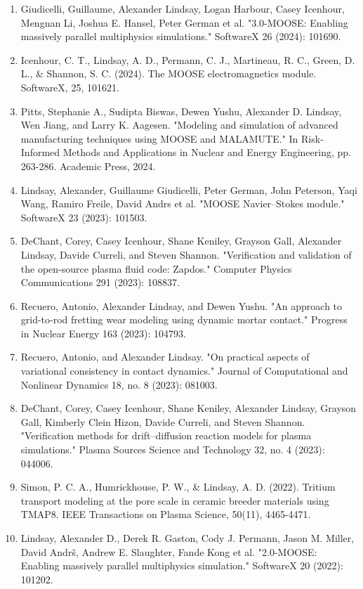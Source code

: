 \begin{enumerate}
    LWR fuel rod. Nuclear Engineering and Design, 424, 113291.
  \item Giudicelli, Guillaume, Alexander Lindsay, Logan Harbour, Casey Icenhour,
    Mengnan Li, Joshua E. Hansel, Peter German et al. "3.0-MOOSE: Enabling
    massively parallel multiphysics simulations." SoftwareX 26 (2024): 101690.
  \item Icenhour, C. T., Lindsay, A. D., Permann, C. J., Martineau, R. C.,
    Green, D. L., \& Shannon, S. C. (2024). The MOOSE electromagnetics
    module. SoftwareX, 25, 101621.
  \item Pitts, Stephanie A., Sudipta Biswas, Dewen Yushu, Alexander D. Lindsay, Wen Jiang, and Larry K. Aagesen. "Modeling and simulation of advanced manufacturing techniques using MOOSE and MALAMUTE." In Risk-Informed Methods and Applications in Nuclear and Energy Engineering, pp. 263-286. Academic Press, 2024.
  \item Lindsay, Alexander, Guillaume Giudicelli, Peter German, John Peterson, Yaqi Wang, Ramiro Freile, David Andrs et al. "MOOSE Navier–Stokes module." SoftwareX 23 (2023): 101503.
  \item DeChant, Corey, Casey Icenhour, Shane Keniley, Grayson Gall, Alexander Lindsay, Davide Curreli, and Steven Shannon. "Verification and validation of the open-source plasma fluid code: Zapdos." Computer Physics Communications 291 (2023): 108837.
  \item Recuero, Antonio, Alexander Lindsay, and Dewen Yushu. "An approach to grid-to-rod fretting wear modeling using dynamic mortar contact." Progress in Nuclear Energy 163 (2023): 104793.
  \item Recuero, Antonio, and Alexander Lindsay. "On practical aspects of variational consistency in contact dynamics." Journal of Computational and Nonlinear Dynamics 18, no. 8 (2023): 081003.
  \item DeChant, Corey, Casey Icenhour, Shane Keniley, Alexander Lindsay, Grayson Gall, Kimberly Clein Hizon, Davide Curreli, and Steven Shannon. "Verification methods for drift–diffusion reaction models for plasma simulations." Plasma Sources Science and Technology 32, no. 4 (2023): 044006.
  \item Simon, P. C. A., Humrickhouse, P. W., \& Lindsay, A. D. (2022). Tritium transport modeling at the pore scale in ceramic breeder materials using TMAP8. IEEE Transactions on Plasma Science, 50(11), 4465-4471.
  \item Lindsay, Alexander D., Derek R. Gaston, Cody J. Permann, Jason M. Miller, David Andrš, Andrew E. Slaughter, Fande Kong et al. "2.0-MOOSE: Enabling massively parallel multiphysics simulation." SoftwareX 20 (2022): 101202.

\end{enumerate}
